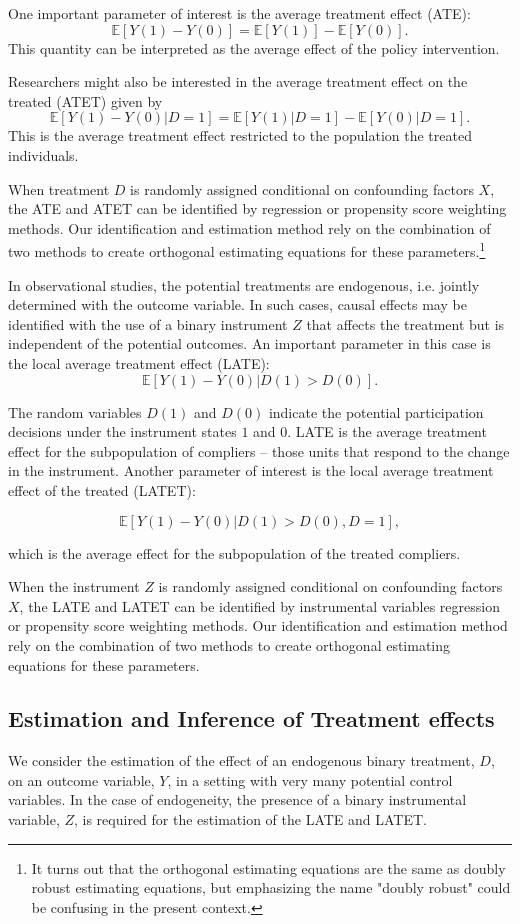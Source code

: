 \documentclass{amsart}\usepackage[]{graphicx}\usepackage[]{color}
\begin{document}
One important parameter of interest is the average treatment effect (ATE):
\[ \mathbb{E}[Y(1)-Y(0)] =  \mathbb{E}[Y(1)] - \mathbb{E}[Y(0)]. \]
This quantity can be interpreted as the average effect of the policy intervention.

Researchers might also be interested in the average treatment effect on the treated (ATET) given by
\[ \mathbb{E}[Y(1)-Y(0)|D=1] =  \mathbb{E}[Y(1)|D=1] - \mathbb{E}[Y(0)|D=1]. \]
This is the average treatment effect restricted to the population the treated individuals.

When treatment $D$ is randomly assigned conditional on confounding factors $X$, the ATE and ATET can be identified by regression or propensity score weighting methods.  Our identification and estimation method rely on the combination of two methods to create orthogonal estimating equations for these parameters.\footnote{It turns out that the orthogonal estimating equations are the same as doubly robust estimating equations, but emphasizing the name "doubly robust" could be confusing in the present context.}


In observational studies, the potential treatments are endogenous, i.e. jointly determined with the outcome variable.  In such cases, causal effects may be identified with the 
use of a binary instrument $Z$ that affects the treatment but is independent of the potential outcomes.  An important parameter in this case is
the local average treatment effect (LATE):
\[  \mathbb{E}[Y(1)-Y(0)| D(1) > D(0)]. \]

The random variables $D(1)$ and $D(0)$ indicate the potential participation decisions under the instrument states $1$  and $0$.
LATE is the average treatment effect for the subpopulation of compliers -- those units that respond to the change in the instrument.  Another parameter of interest is the  local average treatment effect of the treated (LATET):

\[  \mathbb{E}[Y(1)-Y(0)| D(1) > D(0), D=1], \]

which is the average effect for the subpopulation of the treated compliers. 

When the instrument $Z$ is randomly assigned conditional on confounding factors $X$, the LATE and LATET can be identified by instrumental variables regression or propensity score weighting methods.  Our identification and estimation method rely on the combination of two methods to create orthogonal estimating equations for these parameters.

\subsection{Estimation and Inference of Treatment effects}
We  consider the estimation of the effect of an endogenous binary treatment, $D$, on an outcome variable, $Y$, in a setting with very many potential control variables. In the case of endogeneity, the presence of a binary instrumental variable, $Z$, is required for the estimation of the LATE and LATET. 
\end{document}
